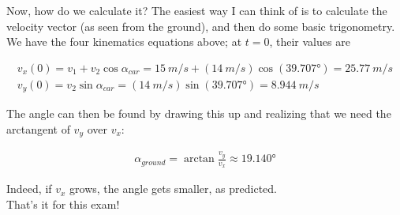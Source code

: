 \documentclass[8.01x]{subfiles}
\begin{document}
Now, how do we calculate it? The easiest way I can think of is to calculate the velocity vector (as seen from the ground), and then do some basic trigonometry. We have the four kinematics equations above; at $t = 0$, their values are

\begin{align}
v_x(0) = v_1 + v_2 \cos \alpha_{car} = \SI{15}{m/s} + (\SI{14}{m/s}) \cos(\ang{39.707}) = \SI{25.77}{m/s}\\
v_y(0) = v_2 \sin \alpha_{car} = (\SI{14}{m/s}) \sin(\ang{39.707}) = \SI{8.944}{m/s}
\end{align}

The angle can then be found by drawing this up and realizing that we need the arctangent of $v_y$ over $v_x$:

\begin{align}
\alpha_{ground} = \arctan \frac{v_y}{v_x} \approx \ang{19.140}
\end{align}

Indeed, if $v_x$ grows, the angle gets smaller, as predicted.\\
That's it for this exam!
\end{document}
